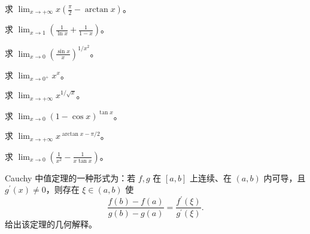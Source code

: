 \newpage
\noindent\begin{minipage}{\textwidth}
求 $\displaystyle\lim_{x\to+\infty}x\left(\frac\pi2-\arctan x\right)$。
\end{minipage}\par\vfill
\noindent\begin{minipage}{\textwidth}
求 $\displaystyle\lim_{x\to1}\left(\frac1{\ln x}+\frac1{1-x}\right)$。
\end{minipage}\par\vfill
\noindent\begin{minipage}{\textwidth}
求 $\displaystyle\lim_{x\to0}\left(\frac{\sin x}{x}\right)^{1/x^2}$。
\end{minipage}\par\vfill
\noindent\begin{minipage}{\textwidth}
求 $\displaystyle\lim_{x\to0^+}x^x$。
\end{minipage}\par\vfill
\newpage
\noindent\begin{minipage}{\textwidth}
求 $\displaystyle\lim_{x\to+\infty}x^{1/\sqrt{x}}$。
\end{minipage}\par\vfill
\noindent\begin{minipage}{\textwidth}
求 $\displaystyle\lim_{x\to0}(1-\cos x)^{\tan x}$。
\end{minipage}\par\vfill
\noindent\begin{minipage}{\textwidth}
求 $\displaystyle\lim_{x\to+\infty}x^{\arctan x-\pi/2}$。
\end{minipage}\par\vfill
\noindent\begin{minipage}{\textwidth}
求 $\displaystyle\lim_{x\to0}\left(\frac1{x^2}-\frac1{x\tan x}\right)$。
\end{minipage}\par\vfill
\newpage
\noindent\begin{minipage}{\textwidth}
Cauchy 中值定理的一种形式为：若 $f,g$ 在 $[a,b]$ 上连续、在 $(a,b)$ 内可导，且 $g^{\prime}(x)\ne0$，则存在 $\xi\in(a,b)$ 使\[\frac{f(b)-f(a)}{g(b)-g(a)}=\frac{f^{\prime}(\xi)}{g^{\prime}(\xi)}.\]给出该定理的几何解释。
\end{minipage}\par\vfill
